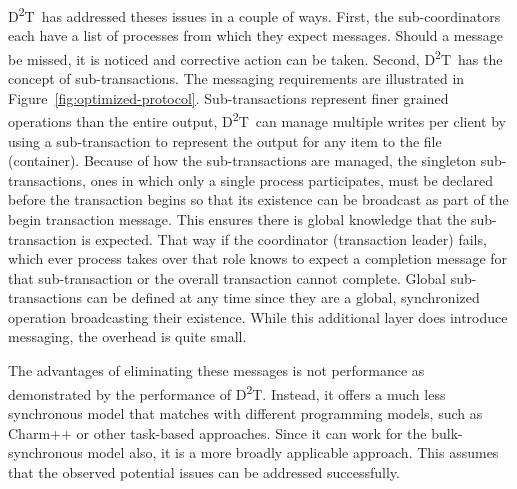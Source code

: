 \documentclass[conference]{IEEEtran}
\newcommand{\DDT}{D\textsuperscript{2}T~}
\newcommand{\DDTns}{D\textsuperscript{2}T}
\begin{document}
\DDT has addressed theses issues in a couple of ways. First, the
sub-coordinators each have a list of processes from which they expect messages.
Should a message be missed, it is noticed and corrective action can be taken.
Second, \DDT has the concept of sub-transactions. The messaging requirements
are illustrated in Figure~\ref{fig:optimized-protocol}.  Sub-transactions
represent finer grained operations than the entire output, \DDT can manage
multiple writes per client by using a sub-transaction to represent the output
for any item to the file (container). Because of how the sub-transactions are
managed, the singleton sub-transactions, ones in which only a single process
participates, must be declared before the transaction begins so that its
existence can be broadcast as part of the begin transaction message. This
ensures there is global knowledge that the sub-transaction is expected.  That
way if the coordinator (transaction leader) fails, which ever process takes
over that role knows to expect a completion message for that sub-transaction or
the overall transaction cannot complete. Global sub-transactions can be defined
at any time since they are a global, synchronized operation broadcasting their
existence. While this additional layer does introduce messaging, the overhead
is quite small.

The advantages of eliminating these messages is not performance as demonstrated
by the performance of \DDTns. Instead, it offers a much less synchronous model
that matches with different programming models, such as Charm++ or other
task-based approaches. Since it can work for the bulk-synchronous model also,
it is a more broadly applicable approach. This assumes that the observed
potential issues can be addressed successfully.
\end{document}
